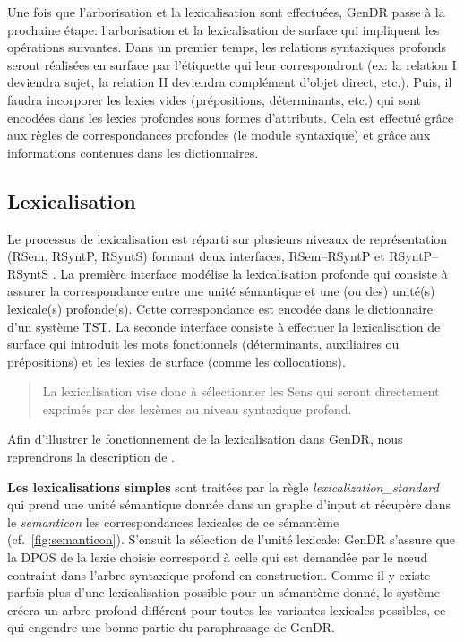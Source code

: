 Une fois que l'arborisation et la lexicalisation sont effectuées, GenDR passe à la prochaine étape: l'arborisation et la lexicalisation de surface qui impliquent les opérations suivantes. Dans un premier temps, les relations syntaxiques profonds seront réalisées en surface par l'étiquette qui leur correspondront (ex: la relation I deviendra sujet, la relation II deviendra complément d'objet direct, etc.). Puis, il faudra incorporer les lexies vides (prépositions, déterminants, etc.) qui sont encodées dans les lexies profondes sous formes d'attributs. Cela est effectué grâce aux règles de correspondances profondes (le module syntaxique) et grâce aux informations contenues dans les dictionnaires.


\subsection{Lexicalisation}\label{sec:lexicalisation}

Le processus de lexicalisation est réparti sur plusieurs niveaux de représentation (\ac{RSem}, \ac{RSyntP}, \ac{RSyntS}) formant deux interfaces, \ac{RSem}--\ac{RSyntP} et \ac{RSyntP}--\ac{RSyntS} \citep{PolguerePourmodelestratifie}. La première interface modélise la lexicalisation profonde qui consiste à assurer la correspondance entre une unité sémantique et une (ou des) unité(s) lexicale(s) profonde(s). Cette correspondance est encodée dans le dictionnaire d'un système \ac{TST}. La seconde interface consiste à effectuer la lexicalisation de surface qui introduit les mots fonctionnels (déterminants, auxiliaires ou prépositions) et les lexies de surface (comme les collocations).

\begin{quote}
La lexicalisation vise donc à sélectionner les Sens qui seront directement exprimés par des lexèmes au niveau syntaxique profond.
\end{quote}
\vspace{-\baselineskip}
\hfill
\cite[p.~154]{PolguereStructurationmisejeu1990}

Afin d'illustrer le fonctionnement de la lexicalisation dans GenDR, nous reprendrons la description de \cite{lareau18}.

\textbf{Les lexicalisations simples}
sont traitées par la règle \emph{lexicalization\_standard} qui prend une unité sémantique donnée dans un graphe d'input et récupère dans le \emph{semanticon} les correspondances lexicales de ce sémantème (cf.~\ref{fig:semanticon}). S'ensuit la sélection de l'unité lexicale: GenDR s'assure que la \ac{DPOS} de la lexie choisie correspond à celle qui est demandée par le n\oe{}ud contraint dans l'arbre syntaxique profond en construction. Comme il y existe parfois plus d'une lexicalisation possible pour un sémantème donné, le système créera un arbre profond différent pour toutes les variantes lexicales possibles, ce qui engendre une bonne partie du paraphrasage de GenDR.

